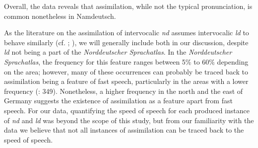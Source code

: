 \documentclass[output=paper]{langsci/langscibook}
\begin{document}
\begin{table}
\caption{Results of a GLMM (assimilation of intervocalic \textit{nd} and \textit{ld})\label{tab:stuhl:5}}
\end{table}

Overall, the data reveals that assimilation, while not the typical pronunciation, is common nonetheless in Namdeutsch. 

As the literature on the assimilation of intervocalic \textit{nd} assumes intervocalic \textit{ld} to behave similarly (cf. \citealt{scheel_hamburger_1963}; \citealt{martens_niederdeutsch-bedingte_1988}), we will generally include both in our discussion, despite \textit{ld} not being a part of the \textit{Norddeutscher Sprachatlas}. In the \textit{Norddeutscher Sprachatlas}, the frequency for this feature ranges between 5\% to 60\% depending on the area; however, many of these occurrences can probably be traced back to assimilation being a feature of fast speech, particularly in the areas with a lower frequency (\citealt{elmentaler_norddeutscher_2015}: 349). Nonetheless, a higher frequency in the north and the east of Germany suggests the existence of assimilation as a feature apart from fast speech. For our data, quantifying the speed of speech for each produced instance of \textit{nd} and \textit{ld} was beyond the scope of this study, but from our familiarity with the data we believe that not all instances of assimilation can be traced back to the speed of speech.
\end{document}
